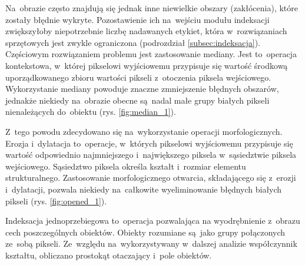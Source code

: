 Na~obrazie często znajdują się jednak inne niewielkie obszary (zakłócenia), które zostały błędnie wykryte. Pozostawienie ich na~wejściu modułu indeksacji zwiększyłoby niepotrzebnie liczbę nadawanych etykiet, która w~rozwiązaniach sprzętowych jest zwykle ograniczona (podrozdział \ref{subsec:indeksacja}).
Częściowym rozwiązaniem problemu jest zastosowanie mediany. 
Jest to~operacja kontekstowa, w~której pikselowi wyjściowemu przypisuje się wartość środkową uporządkowanego zbioru wartości pikseli z~otoczenia piksela wejściowego. 
Wykorzystanie mediany powoduje znaczne zmniejszenie błędnych obszarów, jednakże niekiedy na~obrazie obecne są~nadal małe grupy białych pikseli nienależących do~obiektu (rys. \ref{fig:median_1}).

Z~tego powodu zdecydowano się na~wykorzystanie operacji morfologicznych. 
Erozja i~dylatacja to~operacje, w~których pikselowi wyjściowemu przypisuje się wartość odpowiednio najmniejszego i~największego piksela w~sąsiedztwie piksela wejściowego. 
Sąsiedztwo piksela określa kształt i~rozmiar elementu strukturalnego.  
Zastosowanie morfologicznego otwarcia, składającego się z~erozji i~dylatacji, pozwala niekiedy na~całkowite wyeliminowanie błędnych białych pikseli (rys. \ref{fig:opened_1}).

Indeksacja jednoprzebiegowa to~operacja pozwalająca na wyodrębnienie z~obrazu cech poszczególnych obiektów. Obiekty rozumiane są~jako grupy połączonych ze~sobą pikseli. 
Ze~względu na~wykorzystywany w~dalszej analizie współczynnik kształtu, obliczano prostokąt otaczający i~pole obiektów. 

